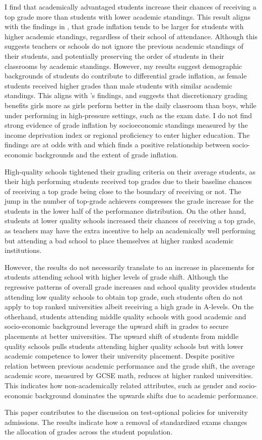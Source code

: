 I find that academically advantaged students increase their chances of receiving a top grade more than students with lower academic standings. This result aligns with the findings in \cite{TYNER2020102037}, that grade inflation tends to be larger for students with higher academic standings, regardless of their school of attendance. Although this suggests teachers or schools do not ignore the previous academic standings of their students, and potentially preserving the order of students in their classrooms by academic standings. However, my results suggest demographic backgrounds of students do contribute to differential grade inflation, as female students received higher grades than male students with similar academic standings. This aligns with \cite{lavy2018}'s findings, and suggests that discretionary grading benefits girls more as girls perform better in the daily classroom than boys, while under performing in high-pressure settings, such as the exam date. I do not find strong evidence of grade inflation by socioeconomic standings measured by the income deprivation index or regional proficiency to enter higher education. The findings are at odds with \cite{hanna2012} and \cite{burgess2013} which finds a positive relationship between socio-economic backgrounds and the extent of grade inflation.

High-quality schools tightened their grading criteria on their average students, as their high performing students received top grades due to their baseline chances of receiving a top grade being close to the boundary of receiving or not. The jump in the number of top-grade achievers compresses the grade increase for the students in the lower half of the performance distribution. On the other hand, students at lower quality schools increased their chances of receiving a top grade, as teachers may have the extra incentive to help an academically well performing but attending a bad school to place themselves at higher ranked academic institutions. 

However, the results do not necessarily translate to an increase in placements for students attending school with higher levels of grade shift. Although the regressive patterns of overall grade increases and school quality provides students attending low quality schools to obtain top grade, such students often do not apply to top ranked universities albeit receiving a high grade in A-levels. On the otherhand, students attending middle quality schools with good academic and socio-economic background leverage the upward shift in grades to secure placements at better universities. The upward shift of students from middle quality schools pulls students attending higher quality schools but with lower academic competence to lower their university placement. Despite positive relation between previous academic performance and the grade shift, the average academic score, measured by GCSE math, reduces at higher ranked universities. This indicates how non-academically related attributes, such as gender and socio-economic background dominates the upwards shifts due to academic performance. 

This paper contributes to the discussion on test-optional policies for university admissions. The results indicate how a removal of standardized exams changes the allocation of grades across the student population. 